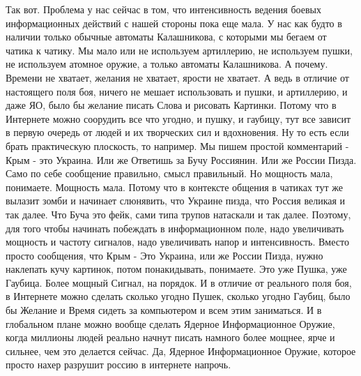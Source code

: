 Так вот. Проблема у нас сейчас в том, что интенсивность ведения боевых информационных действий 
с нашей стороны пока еще мала. У нас как будто в наличии только обычные автоматы Калашникова, с которыми мы бегаем от чатика к чатику. Мы мало или не используем артиллерию, не используем пушки, не используем атомное оружие,
а только автоматы Калашникова. А почему. Времени не хватает, желания не хватает, ярости не хватает.
А ведь в отличие от настоящего поля боя, ничего не мешает использовать и пушки, и артиллерию, и даже ЯО, было бы желание
писать Слова и рисовать Картинки. Потому что в Интернете можно соорудить все что угодно, и пушку, и гаубицу, тут все зависит в первую очередь от людей и их творческих сил и вдохновения. Ну то есть если брать практическую плоскость, то
например. Мы пишем простой комментарий - Крым - это Украина. Или же Ответишь за Бучу Россиянин. Или же
России Пизда. Само по себе сообщение правильно, смысл правильный. Но мощность мала, понимаете. Мощность мала.
Потому что в контексте общения в чатиках тут же вылазит зомби и начинает слюнявить, что Украине пизда, что Россия великая и так далее. Что Буча это фейк, сами типа трупов натаскали и так далее. Поэтому, для того чтобы начинать побеждать в информационном поле, надо увеличивать мощность и частоту сигналов, надо увеличивать напор и интенсивность. Вместо просто сообщения, что Крым - Это Украина, или же России Пизда, нужно наклепать кучу картинок, потом понакидывать,
понимаете. Это уже Пушка, уже Гаубица. Более мощный Сигнал, на порядок. И в отличие от реального поля боя, в Интернете
можно сделать сколько угодно Пушек, сколько угодно Гаубиц, было бы Желание и Время сидеть за компьютером и всем этим заниматься. И в глобальном плане можно вообще сделать Ядерное Информационное Оружие, когда миллионы людей реально начнут писать намного более мощнее, ярче и сильнее, чем это делается сейчас. Да, Ядерное Информационное Оружие, которое просто нахер
разрушит россию в интернете напрочь.
